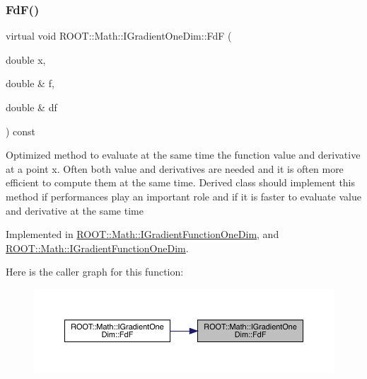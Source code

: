 \subsubsection{\texorpdfstring{FdF()}{FdF()}\hspace{0.1cm}{\footnotesize\ttfamily [1/4]}}
{\footnotesize\ttfamily virtual void R\+O\+O\+T\+::\+Math\+::\+I\+Gradient\+One\+Dim\+::\+FdF (\begin{DoxyParamCaption}\item[{double}]{x,  }\item[{double \&}]{f,  }\item[{double \&}]{df }\end{DoxyParamCaption}) const\hspace{0.3cm}{\ttfamily [pure virtual]}}

Optimized method to evaluate at the same time the function value and derivative at a point x. Often both value and derivatives are needed and it is often more efficient to compute them at the same time. Derived class should implement this method if performances play an important role and if it is faster to evaluate value and derivative at the same time 

Implemented in \mbox{\hyperlink{classROOT_1_1Math_1_1IGradientFunctionOneDim_a01eaedb2ae1dfa5722f11281acf7a72b}{R\+O\+O\+T\+::\+Math\+::\+I\+Gradient\+Function\+One\+Dim}}, and \mbox{\hyperlink{classROOT_1_1Math_1_1IGradientFunctionOneDim_a01eaedb2ae1dfa5722f11281acf7a72b}{R\+O\+O\+T\+::\+Math\+::\+I\+Gradient\+Function\+One\+Dim}}.

Here is the caller graph for this function\+:\nopagebreak
\begin{figure}[H]
\begin{center}
\leavevmode
\includegraphics[width=350pt]{da/d8e/classROOT_1_1Math_1_1IGradientOneDim_aef5560ea7d43e64d94bf875713e2a5fc_icgraph}
\end{center}
\end{figure}
\mbox{\label{classROOT_1_1Math_1_1IGradientOneDim_aef5560ea7d43e64d94bf875713e2a5fc}} 
